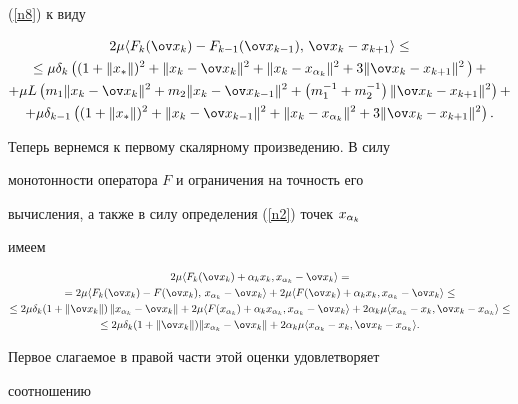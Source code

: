 \begin{pf}
(\ref{n8}) к виду


\begin{multline}\label{n9} 


2\mu \lft F_k(\ov x_k)-F_{k-1}(\ov x_{k-1}),\,


\ov x_k-x_{k+1} \rgt\leq\\


\leq 


\mu\dk\left(\K^2+\Bx^2+\D^2+3\Ax^2\,\right) +\\


+ \mu L\left(m_1\Bx^2+m_2\Cx^2+\left(m_1^{-1}+ m_2^{-1}\right)


\Ax^2\right) +\\


+ \mu\dkk\left(\K^2+\Cx^2+\D^2+3\Ax^2\right).


\end{multline}


Теперь вернемся к первому скалярному произведению. В силу


монотонности оператора $F$ и ограничения на точность его


вычисления, а также в силу определения (\ref{n2}) точек $x_{\alpha_k}$


имеем


\begin{multline*}


2\mu \lft \Fa, \xak -\ov x_k \rgt=\\


= 2\mu \lft F_k(\ov x_k)-F(\ov x_k),\,\xak -\ov x_k \rgt +


 2\mu \lft F(\ov x_k)+\alpha_k x_k,\xak -\ov x_k \rgt \leq \\


\leq 2\mu \dk(1+\|\ov x_k\|)\,\|\xak -\ov x_k \| +


2\mu \lft F( \xak)+\ak\xak,\xak -\ov x_k \rgt +


2\ak\mu \lft \xak-x_k, \ov x_k-\xak\rgt \leq\\


\leq 2\mu \dk(1+\|\ov x_k\|)\|


\xak -\ov x_k \| + 2\ak\mu


\lft \xak-x_k, \ov x_k-\xak\rgt .


\end{multline*}


Первое слагаемое в правой части этой оценки удовлетворяет


соотношению


\begin{align*}



\end{align*}
\end{pf}
